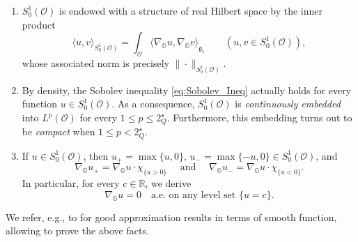 \documentclass[11pt]{amsart}
\numberwithin{equation}{section} %
\theoremstyle{definition}
\begin{document}
\begin{enumerate}
 \item $S_0^1(\mathcal{O})$ is endowed with a structure of real Hilbert space by the inner product
 $$\langle u,v\rangle_{S_0^{1}(\mathcal{O})} = \int_{\mathcal{O}}\langle \nabla_\mathbb{G}u,
 \nabla_\mathbb{G}v\rangle_{\mathfrak{g}_{1}}\qquad (u,v\in S_0^1(\mathcal{O})),$$
whose associated norm is precisely $\|\cdot\|_{S_0^1(\mathcal{O})}$.

 \item By density, the Sobolev inequality \eqref{eq:Sobolev_Ineq} actually holds for every function $u\in S_0^1(\mathcal{O})$. As a consequence, $S_0^1(\mathcal{O})$ is \emph{continuously embedded} into $L^p(\mathcal{O})$ for every $1\leq p\leq 2_Q^\star$.
 Furthermore, this embedding turns out to be \emph{compact} when $1\leq p < 2_Q^\star$. 
 \item If $u\in S_0^1(\mathcal{O})$, then $u_+ = \max\{u,0\},\,u_- = \max\{-u,0\}\in S_0^1(\mathcal{O})$, and
 $$\nabla_\mathbb{G}u_+ = \nabla_\mathbb{G}u\cdot\chi_{\{u > 0\}}
 \quad \textrm{ and } \quad  \nabla_\mathbb{G}u_- = \nabla_\mathbb{G}u\cdot\chi_{\{u < 0\}}.
 $$
 In particular, for every $c \in\mathbb{R}$, we derive
 \begin{equation}\label{eq:Grad_and_level_set}
 	\nabla_\mathbb{G}u = 0  \quad \textrm{a.e. on any level set } \{u = c\}.
 \end{equation}
 \end{enumerate}
We refer, e.g., to \cite{FSSC} for good approximation results in terms of smooth function, allowing to prove the above facts.
\end{document}

